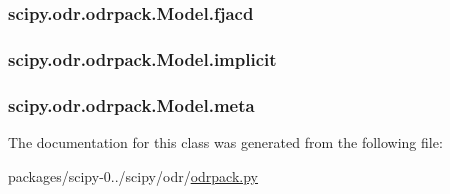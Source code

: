 \subsubsection[{fjacd}]{\setlength{\rightskip}{0pt plus 5cm}scipy.\+odr.\+odrpack.\+Model.\+fjacd}\label{classscipy_1_1odr_1_1odrpack_1_1Model_a55950ac3641574221ce1b55d4efd5767}
\hypertarget{classscipy_1_1odr_1_1odrpack_1_1Model_af179edbbcdc9cfdfc9d73bf653e21c7c}{}
\subsubsection[{implicit}]{\setlength{\rightskip}{0pt plus 5cm}scipy.\+odr.\+odrpack.\+Model.\+implicit}\label{classscipy_1_1odr_1_1odrpack_1_1Model_af179edbbcdc9cfdfc9d73bf653e21c7c}
\hypertarget{classscipy_1_1odr_1_1odrpack_1_1Model_a6b6148d066bcc85573cc50630d45dd62}{}
\subsubsection[{meta}]{\setlength{\rightskip}{0pt plus 5cm}scipy.\+odr.\+odrpack.\+Model.\+meta}\label{classscipy_1_1odr_1_1odrpack_1_1Model_a6b6148d066bcc85573cc50630d45dd62}


The documentation for this class was generated from the following file\+:\begin{DoxyCompactItemize}
\item 
packages/scipy-\/0../scipy/odr/\hyperlink{odrpack_8py}{odrpack.\+py}\end{DoxyCompactItemize}
